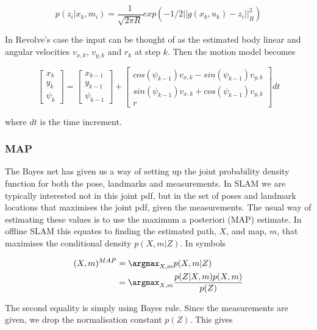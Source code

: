 \begin{equation}
    p(z_i|x_k,m_i) = \frac{1}{\sqrt{2\pi R}}exp(-1/2||g(x_k,u_k) - z_i||^2_R)
\end{equation}

In Revolve's case the input can be thought of as the estimated body linear and angular velocities $v_{x,k}$, $v_{y,k}$ and $r_k$ at step $k$. Then the motion model becomes 

\begin{equation}
    \begin{bmatrix} x_k \\ y_k \\ \psi_k \end{bmatrix} = \begin{bmatrix} x_{k-1} \\ y_{k-1} \\ \psi_{k-1} \end{bmatrix} + \begin{bmatrix} cos(\psi_{k-1})v_{x,k} - sin(\psi_{k-1})v_{y,k} \\
    sin(\psi_{k-1})v_{x,k} + cos(\psi_{k-1})v_{y,k} \\ r
    \end{bmatrix} dt
\end{equation}

where $dt$ is the time increment.

\subsubsection{MAP}

The Bayes net has given us a way of setting up the joint probability density function for both the pose, landmarks and measurements. In SLAM we are typically interested not in this joint pdf, but in the set of poses and landmark locations that maximises the joint pdf, given the measurements. The usual way of estimating these values is to use the maximum a posteriori (MAP) estimate. In offline SLAM this equates to finding the estimated path, $X$, and map, $m$, that maximises the conditional density $p(X,m|Z)$. In symbols

\begin{align}
    (X,m)^{MAP} &= \argmax_{X,m}p(X,m|Z) \\
    &= \argmax_{X,m}\frac{p(Z|X,m)p(X,m)}{p(Z)}
\end{align}

The second equality is simply using Bayes rule. Since the measurements are given, we drop the normalisation constant $p(Z)$. This gives

